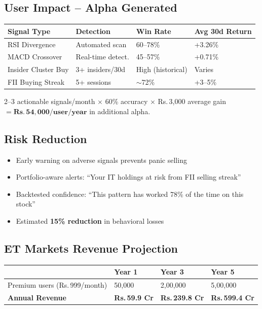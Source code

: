 \documentclass[11pt, a4paper]{article}
\newcommand{\Rs}{Rs.\,}
\begin{document}
\subsection{User Impact -- Alpha Generated}

\begin{center}
\small
\begin{tabular}{L{3.5cm} L{3.5cm} C{2cm} C{3cm}}
  \toprule
  \textbf{Signal Type} & \textbf{Detection} & \textbf{Win Rate} & \textbf{Avg 30d Return} \\
  \midrule
  RSI Divergence      & Automated scan   & 60--78\% & +3.26\% \\
  MACD Crossover      & Real-time detect.& 45--57\% & +0.71\% \\
  Insider Cluster Buy & 3+ insiders/30d  & High (historical) & Varies \\
  FII Buying Streak   & 5+ sessions      & $\sim$72\% & +3--5\% \\
  \bottomrule
\end{tabular}
\end{center}

\begin{orangebox}[title={Conservative Alpha Estimate}]
2--3 actionable signals/month $\times$ 60\% accuracy $\times$ \Rs{}3,000 average gain
$= \mathbf{\Rs{}54,000/user/year}$ in additional alpha.
\end{orangebox}

\subsection{Risk Reduction}

\begin{itemize}[leftmargin=1.6em, itemsep=2pt]
  \item Early warning on adverse signals prevents panic selling
  \item Portfolio-aware alerts: ``Your IT holdings at risk from FII selling streak''
  \item Backtested confidence: ``This pattern has worked 78\% of the time on this stock''
  \item Estimated \textbf{15\% reduction} in behavioral losses
\end{itemize}

\subsection{ET Markets Revenue Projection}

\begin{center}
\small
\begin{tabular}{L{4.5cm} C{2.8cm} C{2.8cm} C{2.8cm}}
  \toprule
  & \textbf{Year 1} & \textbf{Year 3} & \textbf{Year 5} \\
  \midrule
  Premium users (\Rs{}999/month)  & 50,000 & 2,00,000 & 5,00,000 \\
  \textbf{Annual Revenue}     & \textbf{\Rs{}59.9 Cr} & \textbf{\Rs{}239.8 Cr} & \textbf{\Rs{}599.4 Cr} \\
  \bottomrule
\end{tabular}
\end{center}
\end{document}
